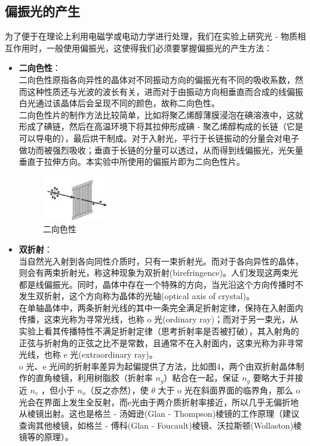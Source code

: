 \documentclass{article}
\begin{document}
\subsection{偏振光的产生}
\hspace*{2em}为了便于在理论上利用电磁学或电动力学进行处理，我们在实验上研究光 - 物质相互作用时，一般使用偏振光，这使得我们必须要掌握偏振光的产生方法：
\begin{itemize}
    \item \textbf{二向色性}：\\
    \hspace*{2em}二向色性原指各向异性的晶体对不同振动方向的偏振光有不同的吸收系数，然而这种性质还与光波的波长有关，进而对于由振动方向相垂直而合成的线偏振白光通过该晶体后会呈现不同的颜色，故称二向色性。\\
    \hspace*{2em}二向色性片的制作方法比较简单，比如将聚乙烯醇薄膜浸泡在碘溶液中，这就形成了碘链，然后在高温环境下将其拉伸形成碘 - 聚乙烯醇构成的长链（它是可以导电的），最后烘干制成。对于入射光，平行于长链振动的分量会对电子做功而被强烈吸收；垂直于长链的分量可以透过，从而得到线偏振光，光矢量垂直于拉伸方向。本实验中所使用的偏振片即为二向色性片。
    \begin{figure}[ht]
        \centering
        \includegraphics[width=3cm]{2.1.png}
        \caption{二向色性}
    \end{figure}
    \item \textbf{双折射}：\\
    \hspace*{2em}当自然光入射到各向同性介质时，只有一束折射光。而对于各向异性的晶体，则会有两束折射光，称这种现象为双折射(birefringence)。人们发现这两束光都是线偏振光。同时，晶体中存在一个特殊的方向，当光沿这个方向传播时不发生双折射，这个方向称为晶体的光轴(optical axis of crystal)。\\
    \hspace*{2em}在单轴晶体中，两条折射光线的其中一条完全满足折射定律，保持在入射面内传播，这束光称为寻常光线，也称 o 光(ordinary ray)；而对于另一束光，从实验上看其传播特性不满足折射定律（思考折射率是否被打破），其入射角的正弦与折射角的正弦之比不是常数，且通常不在入射面内，这束光称为非寻常光线，也称 e 光(extraordinary ray)。\\
    \hspace*{2em}o 光、e 光间的折射率差异为起偏提供了方法，比如图4，两个由双折射晶体制作的直角棱镜，利用树脂胶（折射率 \(n_g\)）粘合在一起，保证 \(n_g\) 要略大于并接近 \(n_e\) ，但小于 \(n_o\)（反之亦然），使 \(\theta\) 大于 o 光在斜面界面的临界角，那么 o 光会在界面上发生全反射，而e光由于两介质折射率接近，所以几乎无偏折地从棱镜出射。这也是格兰 - 汤姆逊(Glan - Thompson)棱镜的工作原理（建议查询其他棱镜，如格兰 - 傅科(Glan - Foucault)棱镜、沃拉斯顿(Wollaston)棱镜等的原理）。

\end{itemize}
\end{document}

